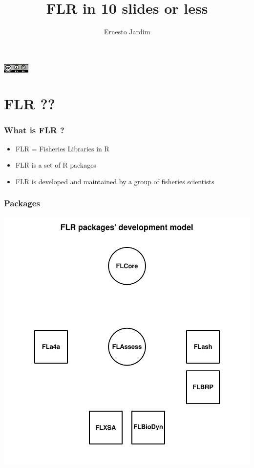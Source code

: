 \documentclass{beamer}%
\title[FLR in 10 slides]{FLR in 10 slides or less}
\author{Ernesto Jardim}
\begin{document}


\begin{frame}%
\titlepage
\begin{flushright}
	\includegraphics[width=0.1\textwidth]{cc.png}
\end{flushright}
\end{frame}


\section{FLR ??}
\begin{frame}
   \frametitle{What is FLR ?}
\begin{itemize}
	\item FLR = Fisheries Libraries in R
	\item FLR is a set of R packages
	\item FLR is developed and maintained by a group of fisheries scientists
\end{itemize}

\end{frame}

\begin{frame}
   \frametitle{Packages}
\includegraphics{FLRin10slides-002}
\end{frame}
\end{document}
